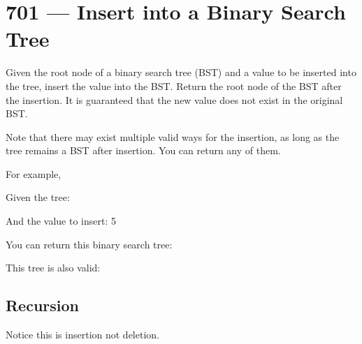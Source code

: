 \section{701 --- Insert into a Binary Search Tree}
Given the root node of a binary search tree (BST) and a value to be inserted into the tree, insert the value into the BST. Return the root node of the BST after the insertion. It is guaranteed that the new value does not exist in the original BST.

Note that there may exist multiple valid ways for the insertion, as long as the tree remains a BST after insertion. You can return any of them.

For example, 

Given the tree:

\begin{figure}[H]
\end{figure}

And the value to insert: 5

You can return this binary search tree:

\begin{figure}[H]
\end{figure}

This tree is also valid:

\begin{figure}[H]
\end{figure}

\subsection{Recursion}
Notice this is insertion not deletion. 

